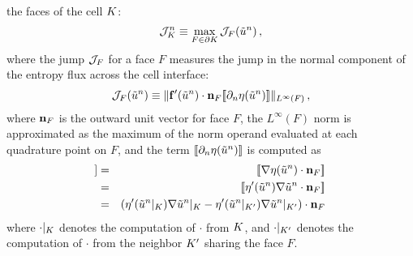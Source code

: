 the faces of the cell $K$:
\begin{equation}
  \mathcal{J}_K^n
  \equiv \max\limits_{F\in\partial K}\mathcal{J}_F(
    \tilde{u}^n) \,,
\end{equation}
where the jump $\mathcal{J}_F$ for a face $F$ measures the jump in the normal
component of the entropy flux across the cell interface:
\begin{equation}
  \mathcal{J}_F(\tilde{u}^n)
  \equiv \|\mathbf{f}'(\tilde{u}^n)
    \cdot\mathbf{n}_F
  [\![\partial_n \eta(\tilde{u}^n)
  ]\!]\|_{L^\infty(F)} \,,
\end{equation}
where $\mathbf{n}_F$ is the outward unit vector for face $F$, the
$L^\infty(F)$ norm is approximated as the maximum of the norm operand evaluated
at each quadrature point on $F$, and the term $[\![\partial_n \eta(
\tilde{u}^n)]\!]$ is computed as
\begin{eqnarray}
  [\![\partial_n \entropy(\approximatescalarsolution^\timeindex)]\!]
  & = & [\![\nabla\entropy(\approximatescalarsolution^\timeindex)
    \cdot\normalvector_F]\!]\\
  & = & [\![\entropy'(\approximatescalarsolution^\timeindex)
    \nabla\approximatescalarsolution^\timeindex\cdot\normalvector_F]\!]\\
  & = & (\entropy'(\approximatescalarsolution^\timeindex
    |_\cellindex)\nabla\approximatescalarsolution^\timeindex|_\cellindex
    - \entropy'(\approximatescalarsolution^\timeindex
    |_{\cellindex'})\nabla\approximatescalarsolution^\timeindex|_{\cellindex'})
    \cdot\normalvector_F
\end{eqnarray}
where $\cdot|_K$ denotes the computation of $\cdot$ from $K$,
and $\cdot|_{K'}$ denotes the computation of $\cdot$ from the neighbor
$K'$ sharing the face $F$.
